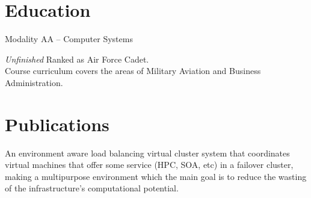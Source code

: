 \documentclass[11pt, a4paper, sans]{moderncv} %
\begin{document}
\section{Education}

{
Modality AA -- Computer Systems
}  

{\textit{Unfinished}}
{
Ranked as Air Force Cadet. \\
Course curriculum covers the areas of Military Aviation and Business Administration. 
}












\section{Publications}
{
An environment aware load balancing virtual cluster system that coordinates virtual machines that offer some service (HPC, SOA, etc) in a failover cluster, making a multipurpose environment which the main goal is to reduce the wasting of the infrastructure's computational potential. 
}
\end{document}

